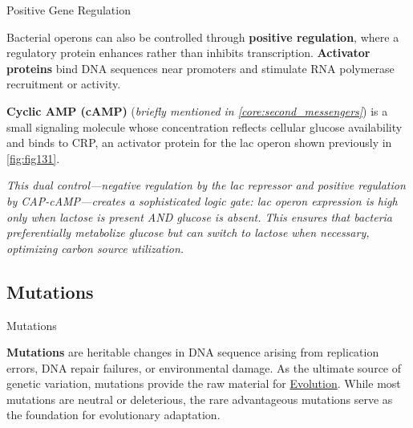 \documentclass[10pt]{article}
\begin{document}
    \begin{core}{Positive Gene Regulation}
      
      Bacterial operons can also be controlled through \textbf{positive regulation}, where a regulatory protein enhances rather than inhibits transcription. \textbf{Activator proteins} bind DNA sequences near promoters and stimulate RNA polymerase recruitment or activity.
      
      \textbf{Cyclic AMP (cAMP)} (\textit{briefly mentioned in \autoref{core:second_messengers}}) is a small signaling molecule whose concentration reflects cellular glucose availability and binds to CRP, an activator protein for the lac operon shown previously in \autoref{fig:fig131}. 


      \textit{This dual control---negative regulation by the lac repressor and positive regulation by CAP-cAMP---creates a sophisticated logic gate: lac operon expression is high only when lactose is present AND glucose is absent. This ensures that bacteria preferentially metabolize glucose but can switch to lactose when necessary, optimizing carbon source utilization.}

    \end{core}  

  \subsection{Mutations}

  \begin{core}[label=core:mutations]{Mutations}

      \textbf{Mutations} are heritable changes in DNA sequence arising from replication errors, DNA repair failures, or environmental damage. As the ultimate source of genetic variation, mutations provide the raw material for \href{../evolution/evolution.pdf}{Evolution}. While most mutations are neutral or deleterious, the rare advantageous mutations serve as the foundation for evolutionary adaptation.

    \end{core}
\end{document}

